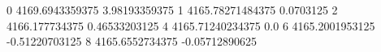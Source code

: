 0 4169.6943359375 3.98193359375
1 4165.78271484375 0.0703125
2 4166.177734375 0.46533203125
4 4165.71240234375 0.0
6 4165.2001953125 -0.51220703125
8 4165.6552734375 -0.05712890625

